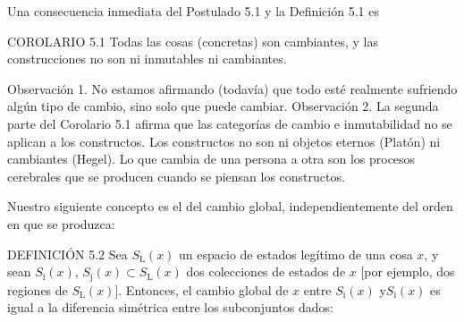 \begin{justifying}
    Una consecuencia inmediata del Postulado 5.1 y la Definición 5.1 es

    \bigskip

    \noindent COROLARIO 5.1 Todas las cosas (concretas) son cambiantes, y las construcciones
    no son ni inmutables ni cambiantes.

    Observación 1. No estamos afirmando (todavía) que todo esté realmente
    sufriendo algún tipo de cambio, sino solo que puede cambiar. Observación
    2. La segunda parte del Corolario 5.1 afirma que las categorías de cambio
    e inmutabilidad no se aplican a los constructos. Los constructos no son ni
    objetos eternos (Platón) ni cambiantes (Hegel). Lo que cambia
    de una persona a otra son los procesos cerebrales que se producen cuando se piensan los constructos.

    Nuestro siguiente concepto es el del cambio global, independientemente del orden en que se produzca:

    \bigskip

    \noindent DEFINICIÓN 5.2 Sea $S_\mathrm{L}(x)$ un espacio de estados legítimo de una cosa $x$, y sean $S_\mathrm{i}(x)$, 
    $S_\mathrm{j}(x) \subset S_\mathrm{L}(x)$ dos colecciones de estados de $x$ [por ejemplo, dos regiones de
    $S_\mathrm{L}(x)$]. Entonces, el cambio global de $x$ entre $S_\mathrm{i}(x)$ y$S_\mathrm{i}(x)$ es igual a la
    diferencia simétrica entre los subconjuntos dados:

\end{justifying}